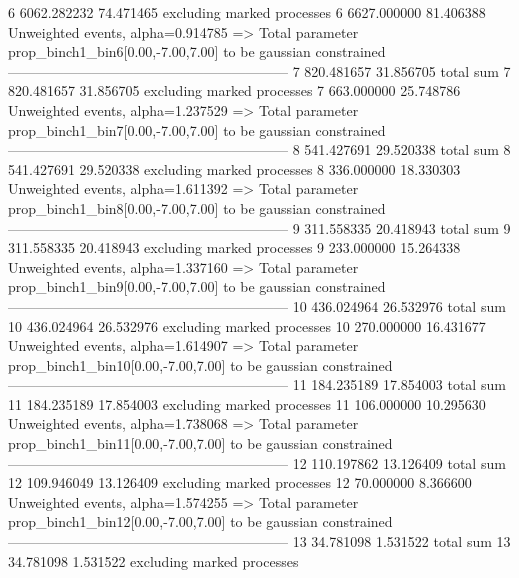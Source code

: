6          6062.282232     74.471465       excluding marked processes    
6          6627.000000     81.406388       Unweighted events, alpha=0.914785
  => Total parameter prop_binch1_bin6[0.00,-7.00,7.00] to be gaussian constrained
------------------------------------------------------------
7          820.481657      31.856705       total sum                     
7          820.481657      31.856705       excluding marked processes    
7          663.000000      25.748786       Unweighted events, alpha=1.237529
  => Total parameter prop_binch1_bin7[0.00,-7.00,7.00] to be gaussian constrained
------------------------------------------------------------
8          541.427691      29.520338       total sum                     
8          541.427691      29.520338       excluding marked processes    
8          336.000000      18.330303       Unweighted events, alpha=1.611392
  => Total parameter prop_binch1_bin8[0.00,-7.00,7.00] to be gaussian constrained
------------------------------------------------------------
9          311.558335      20.418943       total sum                     
9          311.558335      20.418943       excluding marked processes    
9          233.000000      15.264338       Unweighted events, alpha=1.337160
  => Total parameter prop_binch1_bin9[0.00,-7.00,7.00] to be gaussian constrained
------------------------------------------------------------
10         436.024964      26.532976       total sum                     
10         436.024964      26.532976       excluding marked processes    
10         270.000000      16.431677       Unweighted events, alpha=1.614907
  => Total parameter prop_binch1_bin10[0.00,-7.00,7.00] to be gaussian constrained
------------------------------------------------------------
11         184.235189      17.854003       total sum                     
11         184.235189      17.854003       excluding marked processes    
11         106.000000      10.295630       Unweighted events, alpha=1.738068
  => Total parameter prop_binch1_bin11[0.00,-7.00,7.00] to be gaussian constrained
------------------------------------------------------------
12         110.197862      13.126409       total sum                     
12         109.946049      13.126409       excluding marked processes    
12         70.000000       8.366600        Unweighted events, alpha=1.574255
  => Total parameter prop_binch1_bin12[0.00,-7.00,7.00] to be gaussian constrained
------------------------------------------------------------
13         34.781098       1.531522        total sum                     
13         34.781098       1.531522        excluding marked processes    
